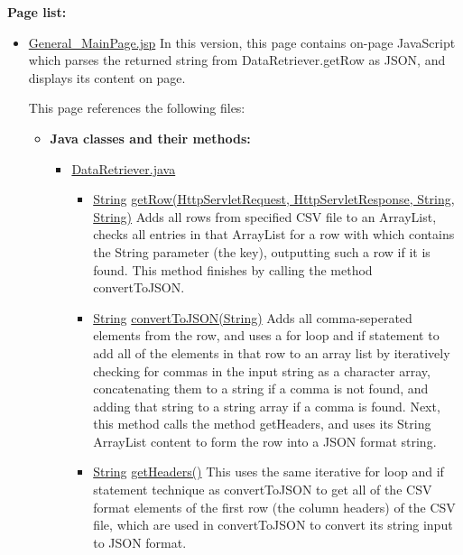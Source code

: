 \textbf{Page list:}
\begin{itemize}
\item \url{General_MainPage.jsp}\newline
In this version, this page contains on-page JavaScript which parses the returned string from DataRetriever.getRow as JSON, and displays its content on page.\newline

 This page references the following files:
\begin{itemize}
\item \textbf{Java classes and their methods:}

\begin{itemize}

\item \url{DataRetriever.java}

\begin{itemize}

\item \url{String}  \url{getRow(HttpServletRequest, HttpServletResponse, String, String)}\newline
Adds all rows from specified CSV file to an ArrayList, checks all entries in that ArrayList for a row with which contains the String parameter (the key), outputting such a row if it is found. This method finishes by calling the method convertToJSON.

\item \url{String} \url{convertToJSON(String)}\newline 
Adds all comma-seperated elements from the row, and uses a for loop and if statement to add all of the elements in that row to an array list by iteratively checking for commas in the input string as a character array, concatenating them to a string if a comma is not found, and adding that string to a string array if a comma is found. Next, this method calls the method getHeaders, and uses its String ArrayList content to form the row into a JSON format string.

\item \url{String} \url{getHeaders()}\newline 
This uses the same iterative for loop and if statement technique as convertToJSON to get all of the CSV format elements of the first row (the column headers) of the CSV file, which are used in convertToJSON to convert its string input to JSON format.

\end{itemize}


\end{itemize}
\end{itemize}
\end{itemize}
